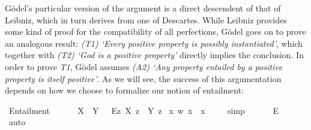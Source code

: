 %
\begin{isabellebody}%
%
%
%
%
%
%
%
%
\isamarkuptrue%
%
\isamarkuptrue%
%
\begin{isamarkuptext}%
G\"odel's particular version of the argument is a direct descendent of that of Leibniz, which in turn derives
  from one of Descartes. While Leibniz provides some kind of proof for the compatibility of all perfections,
 G\"odel goes on to prove an analogous result: \emph{(T1) `Every positive property is possibly instantiated'},
 which together with \emph{(T2) `God is a positive property'} directly implies the conclusion.
 In order to prove \emph{T1}, G\"odel assumes \emph{(A2) `Any property entailed by a positive property is itself positive'}.
 As we will see, the success of this argumentation depends on how we choose to formalize our notion of entailment:%
\end{isamarkuptext}\isamarkuptrue%
\isamarkupfalse%
\ Entailment{\isacharcolon}{\isacharcolon}{\isachardoublequoteopen}{\isasymup}{\isasymlangle}{\isasymup}{\isasymlangle}{\isasymzero}{\isasymrangle}{\isacharcomma}{\isasymup}{\isasymlangle}{\isasymzero}{\isasymrangle}{\isasymrangle}{\isachardoublequoteclose}\ {\isacharparenleft}\ {\isachardoublequoteopen}{\isasymRrightarrow}{\isachardoublequoteclose}\ {}{}{\isacharparenright}\ \isanewline
\ \ {\isachardoublequoteopen}X\ {\isasymRrightarrow}\ Y\ {\isasymequiv}\ \ \isactrlbold {\isasymbox}{\isacharparenleft}\isactrlbold {\isasymforall}\isactrlsup Ez{\isachardot}\ X\ z\ \isactrlbold {\isasymrightarrow}\ Y\ z{\isacharparenright}{\isachardoublequoteclose}\isanewline
{}\isamarkupfalse%
\ {\isachardoublequoteopen}{\isasymlfloor}{\isacharparenleft}{\isasymlambda}x\ w{\isachardot}\ x\ {\isasymnoteq}\ x{\isacharparenright}\ {\isasymRrightarrow}\ {\isasymchi}{\isasymrfloor}{\isachardoublequoteclose}%
\ %
%
\isamarkupfalse%
\ simp\ %
%
%
%
\isanewline
{}\isamarkupfalse%
\ {\isachardoublequoteopen}{\isasymlfloor}\isactrlbold {\isasymnot}{\isacharparenleft}{\isasymphi}\ {\isasymRrightarrow}\ {\isasymchi}{\isacharparenright}\ \isactrlbold {\isasymrightarrow}\ \isactrlbold {\isasymdiamond}\isactrlbold {\isasymexists}\isactrlsup E\ {\isasymphi}{\isasymrfloor}{\isachardoublequoteclose}%
\ %
%
\isamarkupfalse%
\ auto\ %

\end{isabellebody}
